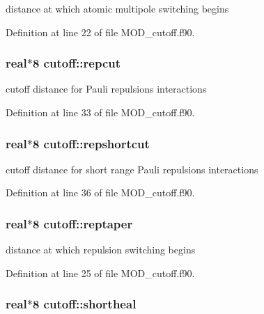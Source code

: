 distance at which atomic multipole switching begins 



Definition at line 22 of file M\-O\-D\-\_\-cutoff.\-f90.

\hypertarget{classcutoff_abf68fbdf5f3b85f07958f7c6aca2f50f}{
\subsubsection[{repcut}]{\setlength{\rightskip}{0pt plus 5cm}real$\ast$8 cutoff\-::repcut}}\label{classcutoff_abf68fbdf5f3b85f07958f7c6aca2f50f}


cutoff distance for Pauli repulsions interactions 



Definition at line 33 of file M\-O\-D\-\_\-cutoff.\-f90.

\hypertarget{classcutoff_a4d74fd4860bdb3b1665921c730e16681}{
\subsubsection[{repshortcut}]{\setlength{\rightskip}{0pt plus 5cm}real$\ast$8 cutoff\-::repshortcut}}\label{classcutoff_a4d74fd4860bdb3b1665921c730e16681}


cutoff distance for short range Pauli repulsions interactions 



Definition at line 36 of file M\-O\-D\-\_\-cutoff.\-f90.

\hypertarget{classcutoff_a9b8b3c87cffb3131d08ddccc32c52699}{
\subsubsection[{reptaper}]{\setlength{\rightskip}{0pt plus 5cm}real$\ast$8 cutoff\-::reptaper}}\label{classcutoff_a9b8b3c87cffb3131d08ddccc32c52699}


distance at which repulsion switching begins 



Definition at line 25 of file M\-O\-D\-\_\-cutoff.\-f90.

\hypertarget{classcutoff_a9f17980720278e5796449a35477f55ee}{
\subsubsection[{shortheal}]{\setlength{\rightskip}{0pt plus 5cm}real$\ast$8 cutoff\-::shortheal}}\label{classcutoff_a9f17980720278e5796449a35477f55ee}


